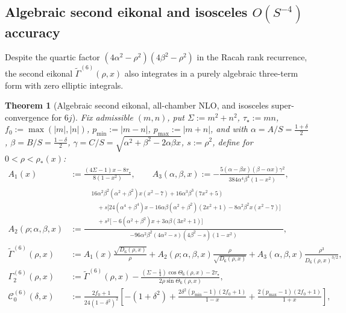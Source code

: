 \documentclass[11pt]{article}
\newtheorem{theorem}{Theorem}[section]
\theoremstyle{definition}
\theoremstyle{remark}
\newcommand{\cC}{\mathcal{C}}
\renewcommand{\_}{\oldunderscore\penalty0\hskip0pt\relax}
\begin{document}
\subsection{Algebraic second eikonal and isosceles \texorpdfstring{$O(S^{-4})$}{O(S^-4)} accuracy}
Despite the quartic factor $(4\alpha^2-\rho^2)(4\beta^2-\rho^2)$ in the Racah rank recurrence, the second eikonal
  $\widetilde{\Gamma}^{(6)}(\rho,x)$ also integrates in a purely algebraic three-term form with zero elliptic integrals.

\begin{theorem}[Algebraic second eikonal, all-chamber NLO, and isosceles super-convergence for $6j$]
\label{thm:racah-u2-cov}
Fix admissible $(m,n)$, put $\Sigma:=m^2+n^2$, $\tau_\star:=mn$, $f_0:=\max(|m|,|n|)$, $p_{\min}:=|m-n|$, $p_{\max}:=|m+n|$, and
  with $\alpha=A/S=\frac{1+\delta}{2}$, $\beta=B/S=\frac{1-\delta}{2}$, $\gamma=C/S=\sqrt{\alpha^2+\beta^2-2\alpha\beta x}$,
  $s:=\rho^2$, define for $0<\rho<\rho_*(x)$:
\begin{align}
  A_1(x) &:= \frac{(4\Sigma-1)x-8\tau_\star}{8(1-x^2)},\qquad
  A_3(\alpha,\beta,x) := -\frac{5(\alpha-\beta x)(\beta-\alpha x)\gamma^2}{384\alpha^4\beta^4(1-x^2)}, \label{eq:A1-A3}\\
  A_2(\rho;\alpha,\beta,x) &:= \frac{\begin{aligned}
    &16\alpha^2\beta^2(\alpha^2+\beta^2)x(x^2-7) + 16\alpha^3\beta^3(7x^2+5)\\
    &\quad + s\bigl[24(\alpha^4+\beta^4)x - 16\alpha\beta(\alpha^2+\beta^2)(2x^2+1) - 8\alpha^2\beta^2 x(x^2-7)\bigr]\\
    &\quad + s^2\bigl[-6(\alpha^2+\beta^2)x + 3\alpha\beta(3x^2+1)\bigr]
  \end{aligned}}{-96\alpha^2\beta^2(4\alpha^2-s)(4\beta^2-s)(1-x^2)}, \label{eq:A2}\\
  \widetilde{\Gamma}^{(6)}(\rho,x) &:= A_1(x)\frac{\sqrt{D_6(\rho,x)}}{\rho} +
    A_2(\rho;\alpha,\beta,x)\frac{\rho}{\sqrt{D_6(\rho,x)}} + A_3(\alpha,\beta,x)\frac{\rho^3}{D_6(\rho,x)^{3/2}},
    \label{eq:tilde-Gamma-6}\\
  \Gamma_2^{(6)}(\rho,x) &:= \widetilde{\Gamma}^{(6)}(\rho,x) - \frac{(\Sigma-\tfrac14)\cos\Theta_6(\rho,x)-2\tau_\star}{2\rho\sin\Theta_6(\rho,x)}, \label{eq:Gamma2-6}\\
  \cC_0^{(6)}(\delta,x) &:= \frac{2f_0+1}{24(1-\delta^2)^2}\left[-(1+\delta^2) + \frac{2\delta^2(p_{\min}-1)(2f_0+1)}{1-x} +
    \frac{2(p_{\max}-1)(2f_0+1)}{1+x}\right], \label{eq:C0-6}
\end{align}

\end{theorem}
\end{document}
